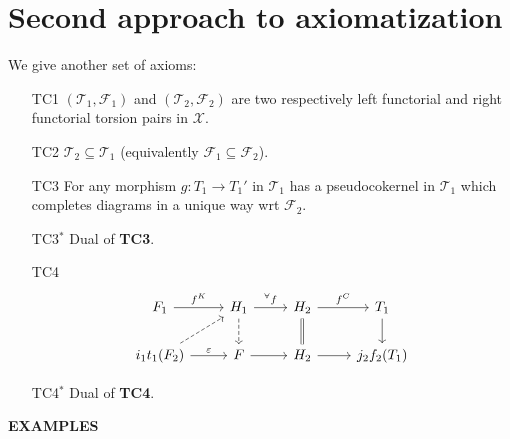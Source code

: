 \clearpage

\section{Second approach to axiomatization}

We give another set of axioms:

\begin{enumerate}
  \item[TC1] $(\mathcal{T}_1, \mathcal{F}_1)$ and $(\mathcal{T}_2,\mathcal{F}_2)$ are two respectively
  left functorial and right functorial torsion pairs in $\mathcal{X}$.
  \item[TC2] $\mathcal{T}_2\subseteq\mathcal{T}_1$ (equivalently $\mathcal{F}_1\subseteq\mathcal{F}_2$).
  \item[TC3] For any morphism $g:T_1 \to T_1'$ in $\mathcal{T}_1$ has a pseudocokernel in $\mathcal{T}_1$ which
  completes diagrams in a unique way wrt $\mathcal{F}_2$.
  \item[TC3$^*$] Dual of \textbf{TC3}.
  \item[TC4]
  \begin{equation*}
    \begin{tikzcd}
      F_1\arrow{r}{f^K}
        & H_1\arrow{r}{^\forall f}\arrow[dashed]{d}
          & H_2 \arrow{r}{f^C}\arrow[equal]{d}
            & T_1 \arrow{d}\\
      i_1t_1(F_2)\arrow[dashed]{ur}\arrow{r}{\varepsilon}
        & F\arrow{r}
          & H_2\arrow{r}
            & j_2f_2(T_1)
    \end{tikzcd}
  \end{equation*}
  \item[TC4$^*$] Dual of \textbf{TC4}.
\end{enumerate}

\textbf{EXAMPLES}

